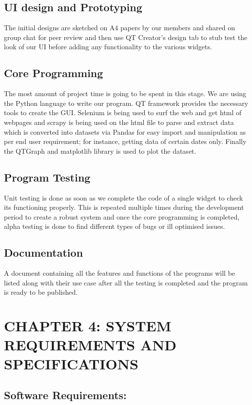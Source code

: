 \documentclass{article}
\begin{document}
\subsection{UI design and Prototyping}
The initial designs are sketched on A4 papers by our members and shared on group chat for peer review and then use QT Creator’s design tab to stub test the look 
of our UI before adding any functionality to the various widgets.

\subsection{Core Programming}
The most amount of project time is going to be spent in this stage. We are using the Python language to write our program. QT framework provides the necessary 
tools to create the GUI. Selenium is being used to surf the web and get html of webpages and scrapy is being used on the html file to parse and extract data 
which is converted into datasets via Pandas for easy import and manipulation as per end user requirement; for instance, getting data of certain dates only. 
Finally the QTGraph and matplotlib library is used to plot the dataset.

\subsection{Program Testing}
Unit testing is done as soon as we complete the code of a single widget to check its functioning properly. This is repeated multiple times during the development 
period to create a robust system and once the core programming is completed, alpha testing is done to find different types of bugs or ill optimised issues.

\subsection{Documentation}
A document containing all the features and functions of the programs will be listed along with their use case after all the testing is completed and the program 
is ready to be published.


\clearpage

\section{CHAPTER 4: SYSTEM REQUIREMENTS AND SPECIFICATIONS}

\subsection{Software Requirements:}
\vspace*{5mm}
\end{document}
